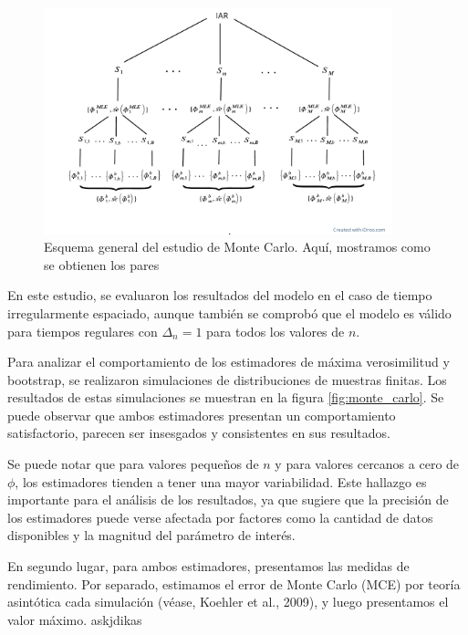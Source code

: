 \begin{figure}[h]
    \includegraphics[trim={0 2cm 0 0},clip,width=0.9\textwidth]{Kap3/Fig_Cap3/4RzQZ8xYXY.pdf}
    \caption{Esquema general del estudio de Monte Carlo. Aquí, mostramos como se obtienen los pares }
    \label{fig:monte_carlo1}
\end{figure}

En este estudio, se evaluaron los resultados del modelo en el caso de tiempo irregularmente espaciado, aunque también se comprobó que el modelo es válido para tiempos regulares con $\Delta_n=1$ para todos los valores de $n$.

Para analizar el comportamiento de los estimadores de máxima verosimilitud y bootstrap, se realizaron simulaciones de distribuciones de muestras finitas. Los resultados de estas simulaciones se muestran en la figura \ref{fig:monte_carlo}. Se puede observar que ambos estimadores presentan un comportamiento satisfactorio, parecen ser insesgados y consistentes en sus resultados.

Se puede notar que para valores pequeños de $n$ y para valores cercanos a cero de $\phi$, los estimadores tienden a tener una mayor variabilidad. Este hallazgo es importante para el análisis de los resultados, ya que sugiere que la precisión de los estimadores puede verse afectada por factores como la cantidad de datos disponibles y la magnitud del parámetro de interés.


En segundo lugar, para ambos estimadores, presentamos las medidas de rendimiento. Por separado, estimamos el error de Monte Carlo (MCE) por teoría asintótica cada simulación (véase, Koehler et al., 2009), y luego presentamos el valor máximo.
 askjdikas
